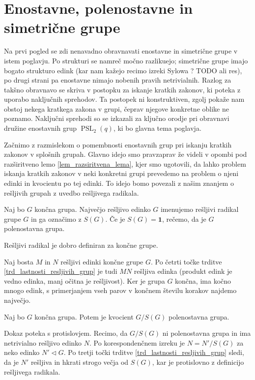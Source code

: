 \section{Enostavne, polenostavne in simetrične grupe}

Na prvi pogled se zdi nenavadno obravnavati enostavne in simetrične grupe v istem poglavju. Po strukturi se namreč močno razlikuejo; simetrične grupe imajo bogato strukturo edink (kar nam kažejo recimo izreki Sylowa ? TODO ali res), po drugi strani pa enostavne
nimajo nobenih pravih netrivialnih. Razlog za takšno obravnavo se skriva v postopku za iskanje kratkih zakonov, ki poteka z uporabo naključnih sprehodov. Ta postopek ni konstruktiven, zgolj pokaže nam obstoj nekega kratkega zakona v grupi, čeprav njegove konkretne oblike ne poznamo.
Naključni sprehodi so se izkazali za ključno orodje pri obravnavi družine enostavnih grup $\operatorname{PSL}_2(q)$, ki bo glavna tema poglavja.

Začnimo z razmislekom o pomembnosti enostavnih grup pri iskanju kratkih zakonov v splošnih grupah. Glavno idejo smo pravzaprav že videli v opombi pod razširitveno lemo \ref{lem_razsiritvena_lema}, kjer smo ugotovili, da
lahko problem iskanja kratkih zakonov v neki konkretni grupi prevedemo na problem o njeni edinki in kvocientu po tej edinki. To idejo bomo povezali z našim znanjem o rešljivih grupah z uvedbo rešljivega radikala.

\begin{definicija}
\label{def_resljiv_radikal}
Naj bo $G$ končna grupa. Največjo rešljivo edinko $G$ imenujemo rešljivi radikal grupe $G$ in ga označimo z $S(G)$. Če je $S(G) = \mathbf{1}$, rečemo, da je $G$ polenostavna grupa.
\end{definicija}
\begin{lema}
\label{lem_dobra_definiranost_resljivega_radikala}
Rešljivi radikal je dobro definiran za končne grupe.
\end{lema}
\begin{dokaz}
    Naj bosta $M$ in $N$ rešljivi edinki končne grupe $G$. Po četrti točke trditve \ref{trd_lastnosti_resljivih_grup} je tudi $MN$ rešljiva edinka (produkt edink je vedno edinka, manj očitna je rešljivost). Ker je grupa $G$ končna, ima kočno mnogo edink,
    s primerjanjem vseh parov v končnem številu korakov najdemo največjo. 
\end{dokaz}

\begin{lema}
\label{lem_resljiv_radikal_je_polenostaven}
Naj bo $G$ končna grupa. Potem je kvocient $G / S(G)$ polenostavna grupa. 
\end{lema}
\begin{dokaz}
    Dokaz poteka s protislovjem. Recimo, da $G / S(G)$ ni polenostavna grupa in ima netrivialno rešljivo edinko $N$. Po korespondenčnem izreku je $N = N' / S(G)$ za neko edinko $N' \triangleleft G$.
    Po tretji točki trditve \ref{trd_lastnosti_resljivih_grup} sledi, da je $N'$ rešljiva in hkrati strogo večja od $S(G)$, kar je protislovno z definicijo rešljivega radikala.
\end{dokaz}

